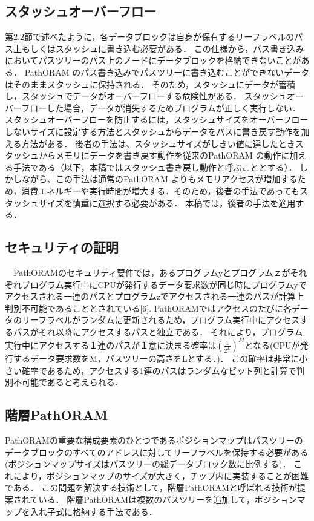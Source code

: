 \documentclass{jarticle}
\begin{document}
\subsection{スタッシュオーバーフロー}
第2.2節で述べたように，各データブロックは自身が保有するリーフラベルのパス上もしくはスタッシュに書き込む必要がある．
この仕様から，パス書き込みにおいてパスツリーのパス上のノードにデータブロックを格納できないことがある．
PathORAM のパス書き込みでパスツリーに書き込むことができないデータはそのままスタッシュに保持される．
そのため，スタッシュにデータが蓄積し，スタッシュでデータがオーバーフローする危険性がある．
スタッシュオーバーフローした場合，データが消失するためプログラムが正しく実行しない．
スタッシュオーバーフローを防止するには，スタッシュサイズをオーバーフローしないサイズに設定する方法とスタッシュからデータをパスに書き戻す動作を加える方法がある．
後者の手法は、スタッシュサイズがしきい値に達したときスタッシュからメモリにデータを書き戻す動作を従来のPathORAM の動作に加える手法である（以下，本稿ではスタッシュ書き戻し動作と呼ぶこととする）．
しかしながら、この手法は通常のPathORAM よりもメモリアクセスが増加するため，消費エネルギーや実行時間が増大する．そのため，後者の手法であってもスタッシュサイズを慎重に選択する必要がある．
本稿では，後者の手法を適用する．

\subsection{セキュリティの証明}

　PathORAMのセキュリティ要件では，あるプログラムyとプログラムｚがそれぞれプログラム実行中にCPUが発行するデータ要求数が同じ時にプログラムyでアクセスされる一連のパスとプログラムzでアクセスされる一連のパスが計算上判別不可能であることとされている[6].
PathORAMではアクセスのたびに各データのリーフラベルがランダムに更新されるため，プログラム実行中にアクセスするパスがそれ以降にアクセスするパスと独立である．
それにより，プログラム実行中にアクセスする１連のパスが１意に決まる確率は$(\frac{1}{2^L})^M$となる(CPUが発行するデータ要求数をM，パスツリーの高さをLとする．)．
この確率は非常に小さい確率であるため，アクセスする1連のパスはランダムなビット列と計算で判別不可能であると考えられる．

\subsection{階層PathORAM}
PathORAMの重要な構成要素のひとつであるポジションマップはパスツリーのデータブロックのすべてのアドレスに対してリーフラベルを保持する必要がある
(ポジションマップサイズはパスツリーの総データブロック数に比例する)．
これにより，ポジションマップのサイズが大きく，チップ内に実装することが困難である．
この問題を解決する技術として，階層PathORAMと呼ばれる技術が提案されている．
階層PathORAMは複数のパスツリーを追加して，ポジションマップを入れ子式に格納する手法である．
\end{document}
